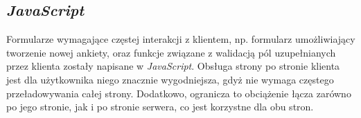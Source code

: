 \subsection{\textit{JavaScript}}
\label{Chapter63b}

Formularze wymagające częstej interakcji z klientem, np. formularz umożliwiający tworzenie nowej ankiety, oraz funkcje związane z walidacją pól uzupełnianych przez klienta zostały napisane w \textit{JavaScript}. Obsługa strony po stronie klienta jest dla użytkownika niego znacznie wygodniejsza, gdyż nie wymaga częstego przeładowywania całej strony. Dodatkowo, ogranicza to obciążenie łącza zarówno po jego stronie, jak i po stronie serwera, co jest korzystne dla obu stron.
